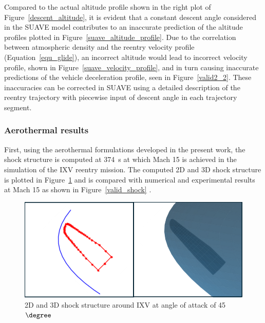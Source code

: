\documentclass[%
 aip,
 amsmath,amssymb,
preprint,%
]{revtex4-1}
\begin{document}
Compared to the actual altitude profile shown in the right plot of Figure~\ref{descent_altitude}, it is evident that a constant descent angle considered in the SUAVE model contributes to an inaccurate prediction of the altitude profiles plotted in Figure~\ref{suave_altitude_profile}. Due to the correlation between atmospheric density and the reentry velocity profile (Equation~\eqref{equ_glide}), an incorrect altitude would lead to incorrect velocity profile, shown in Figure~\ref{suave_velocity_profile}, and in turn causing inaccurate predictions of the vehicle deceleration profile, seen in Figure~\ref{valid2_2}. These inaccuracies can be corrected in SUAVE using a detailed description of the reentry trajectory with piecewise input of descent angle in each trajectory segment.

\subsubsection{Aerothermal results}
First, using the aerothermal formulations developed in the present work, the shock structure is computed at 374~s at which Mach 15 is achieved in the simulation of the IXV reentry mission. The computed 2D and 3D shock structure is plotted in Figure~\ref{SUAVE_shock} and is compared with numerical and experimental results at Mach 15 as shown in Figure~\ref{valid_shock} \cite{paris2011experimental}.

\begin{figure}[h!]
\centering
\includegraphics[width=0.6\linewidth]{IXV_shock_plot.png}
\caption{2D and 3D shock structure around IXV at angle of attack of 45$\degree$}
\label{SUAVE_shock}
\end{figure}
\end{document}
